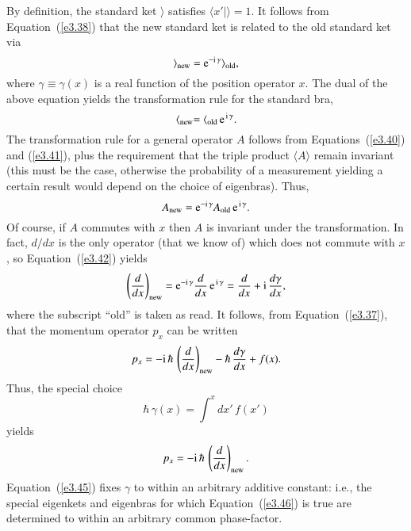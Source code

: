 By definition, the standard ket $\rangle$ satisfies $\langle x'|\rangle = 1$.
It follows from Equation~(\ref{e3.38}) that the new standard ket is related to the
old standard ket via
\begin{equation}\label{e3.40}
\rangle_{\rm new} = {\rm e}^{-{\rm i}\, \gamma} \rangle_{\rm old},
\end{equation}
where $\gamma\equiv \gamma(x)$ is a real function of the position operator $x$. 
The dual of the above equation yields the transformation rule for
the standard bra,
\begin{equation}\label{e3.41}
\langle_{\rm new} = \langle_{\rm old} \,{\rm e}^{\,{\rm i}\, \gamma}.
\end{equation}
The transformation rule for a general operator $A$ follows from Equations~(\ref{e3.40}) and (\ref{e3.41}),
plus the requirement that the triple product $\langle A\rangle$ remain
invariant (this must be the case, otherwise the probability of a measurement
yielding a certain result would depend on the choice of eigenbras). Thus,
\begin{equation}\label{e3.42}
A_{\rm new} = {\rm e}^{-{\rm i}\,\gamma} A_{\rm old}\,{\rm e}^{\,{\rm i}\,\gamma}.
\end{equation}
Of course, if $A$ commutes with $x$ then $A$ is invariant under the transformation.
In fact, $d/dx$ is the only operator (that we know of) which does not commute
with $x$, so Equation~(\ref{e3.42}) yields
\begin{equation}
\left(\frac{d}{dx}\right)_{\rm new} =  {\rm e}^{-{\rm i}\,\gamma}\frac{d}{dx}\,{\rm e}^{\,{\rm i}\,\gamma} = \frac{d}{dx} + {\rm i}\, \frac{d\gamma}{dx},
\end{equation}
where the subscript ``old'' is taken as read. It follows, from Equation~(\ref{e3.37}), that
the momentum operator $p_x$ can be written
\begin{equation}
p_x = -{\rm i} \,\hbar\,\left(\frac{d}{dx}\right)_{\rm new} - \hbar\,\frac{d\gamma}{dx} + f(x).
\end{equation}
Thus, the special choice
\begin{equation}\label{e3.45}
\hbar\,\gamma(x) = \int^x dx'\, f(x')
\end{equation}
 yields
\begin{equation}\label{e3.46}
p_x =  -{\rm i} \,\hbar\,\left(\frac{d}{dx}\right)_{\rm new}.
\end{equation}
Equation~(\ref{e3.45}) fixes $\gamma$ to
within an arbitrary additive constant: {\rm i.e.}, the special eigenkets and eigenbras 
for which Equation~(\ref{e3.46}) is true are determined to within an arbitrary common phase-factor. 

